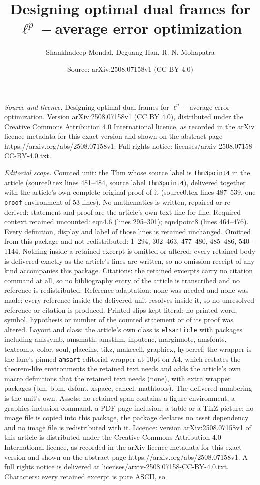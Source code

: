 \documentclass[10pt,a4paper]{amsart}
\title[Designing optimal dual frames for $\ell^p-$average error opt]{Designing optimal dual frames for $\ell^p-$average error optimization}
\author{Shankhadeep Mondal, Deguang Han, R. N. Mohapatra}
\date{Source: arXiv:2508.07158v1 (CC BY 4.0)}
\begin{document}
\maketitle

\noindent\emph{Source and licence.} Designing optimal dual frames for $\ell^p-$average error optimization. Version arXiv:2508.07158v1 (CC BY 4.0), distributed under the Creative Commons Attribution 4.0 International licence, as recorded in the arXiv licence metadata for this exact version and shown on the abstract page https://arxiv.org/abs/2508.07158v1. Full rights notice: licenses/arxiv-2508.07158-CC-BY-4.0.txt.\par\smallskip

\noindent\textit{Editorial scope.} Counted unit: the Thm whose source label is \texttt{thm3point4} in the article (source0.tex lines 481--484, source label \texttt{thm3point4}), delivered together with the article's own complete original proof of it (source0.tex lines 487--539, one \texttt{proof} environment of 53 lines). No mathematics is written, repaired or re-derived: statement and proof are the article's own text line for line. Required context retained uncounted: eqn4.6 (lines 295--301); eqn4point8 (lines 464--476). Every definition, display and label of those lines is retained unchanged. Omitted from this package and not redistributed: 1--294, 302--463, 477--480, 485--486, 540--1144. Nothing inside a retained excerpt is omitted or altered: every retained body is delivered exactly as the article's lines are written, so no omission receipt of any kind accompanies this package. Citations: the retained excerpts carry no citation command at all, so no bibliography entry of the article is transcribed and no reference is redistributed. Reference adaptation: none was needed and none was made; every reference inside the delivered unit resolves inside it, so no unresolved reference or citation is produced. Printed slips kept literal: no printed word, symbol, hypothesis or number of the counted statement or of its proof was altered. Layout and class: the article's own class is \texttt{elsarticle} with packages including amssymb, amsmath, amsthm, inputenc, marginnote, amsfonts, textcomp, color, soul, placeins, tikz, makecell, graphicx, hyperref; the wrapper is the lane's pinned \texttt{amsart} editorial wrapper at 10pt on A4, which restates the theorem-like environments the retained text needs and adds the article's own macro definitions that the retained text needs (none), with extra wrapper packages (bm, bbm, dsfont, xspace, cancel, mathtools). The delivered numbering is the unit's own. Assets: no retained span contains a figure environment, a graphics-inclusion command, a PDF-page inclusion, a table or a TikZ picture; no image file is copied into this package, the package declares no asset dependency and no image file is redistributed with it. Licence: version arXiv:2508.07158v1 of this article is distributed under the Creative Commons Attribution 4.0 International licence, as recorded in the arXiv licence metadata for this exact version and shown on the abstract page https://arxiv.org/abs/2508.07158v1. A full rights notice is delivered at licenses/arxiv-2508.07158-CC-BY-4.0.txt. Characters: every retained excerpt is pure ASCII, so 
\end{document}
